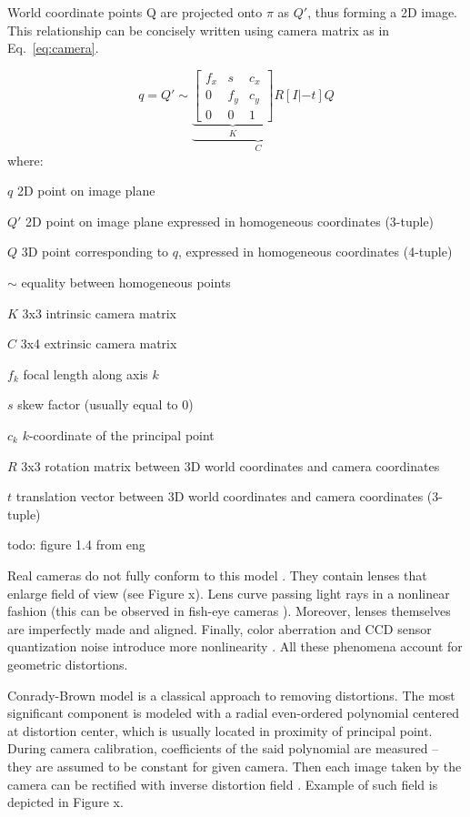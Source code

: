 World coordinate points Q are projected onto \(\pi\) as \(Q'\), thus forming a 2D image. This relationship can be concisely written using camera matrix as in Eq.~\ref{eq:camera}.

\begin{equation}
q = Q' \sim \underbrace{ \underbrace{  \begin{bmatrix}
		f_{x} & s & c_{x} \\ 
		0 & f_{y} & c_{y} \\ 
		0 & 0 & 1
	\end{bmatrix}
}_{K} R \left [ I | -t \right ] }_{C} Q
\label{eq:camera}
\end{equation}
where:
\begin{eqwhere}[2cm]
	\item[$q$] 2D point on image plane
	\item[$Q'$] 2D point on image plane expressed in homogeneous coordinates (3-tuple)
	\item[$Q$] 3D point corresponding to $q$, expressed in homogeneous coordinates (4-tuple)
	\item[$\sim$] equality between homogeneous points
	\item[$K$] 3x3 intrinsic camera matrix
	\item[$C$] 3x4 extrinsic camera matrix
	\item[$f_{k}$] focal length along axis $k$
	\item[$s$] skew factor (usually equal to 0)
	\item[$c_{k}$] $k$-coordinate of the principal point
	\item[$R$] 3x3 rotation matrix between 3D world coordinates and camera coordinates
	\item[$t$] translation vector between 3D world coordinates and camera coordinates (3-tuple)
\end{eqwhere}

todo: figure 1.4 from eng

Real cameras do not fully conform to this model \cite{szczesny}. They contain lenses that enlarge field of view (see Figure x). Lens curve passing light rays in a nonlinear fashion (this can be observed in fish-eye cameras \cite{eng23}). Moreover, lenses themselves are imperfectly made and aligned. Finally, color aberration and CCD sensor quantization noise introduce more nonlinearity \cite{heikkla14}. All these phenomena account for geometric distortions.

Conrady-Brown model \cite{brown8} is a classical approach to removing distortions. The most significant component is modeled with a radial even-ordered polynomial centered at distortion center, which is usually located in proximity of principal point. During camera calibration, coefficients of the said polynomial are measured -- they are assumed to be constant for given camera. Then each image taken by the camera can be rectified with inverse distortion field \cite{opencv}. Example of such field is depicted in Figure x.

